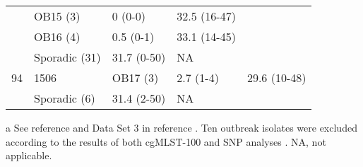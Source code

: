 \begin{table}[!ht]
{\begin{threeparttable}[b]
\begin{tabular}{@{}lllll@{}}
        ~ & OB15 (3) & 0 (0-0) & 32.5 (16-47) & ~ \\
        ~ & OB16 (4) & 0.5 (0-1) & 33.1 (14-45) & ~ \\
        ~ & Sporadic (31) & 31.7 (0-50) & NA & ~ \\
        94 & 1506 & OB17 (3) & 2.7 (1-4) & 29.6 (10-48) \\
        ~ & Sporadic (6) & 31.4 (2-50) & NA & ~ \\
        \bottomrule
    \end{tabular}
    \begin{tablenotes}
       \item [a] {\footnotesize See reference \cite{coelho_genomic_2019} and Data Set 3 in reference \cite{friaes_supplemental_2023}. Ten outbreak isolates were excluded according to the results of both cgMLST-100 and SNP analyses \cite{coelho_genomic_2019}. NA, not applicable.}
    \end{tablenotes}
    \end{threeparttable}
    }
\end{table}